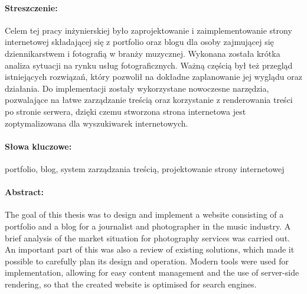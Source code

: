 \documentclass[a4paper, 12pt, twoside]{article}
\numberwithin{figure}{section}
\begin{document}
\begin{sloppypar}






\setcounter{page}{2}
\setcounter{secnumdepth}{3}


\newpage

\paragraph*{Streszczenie:}
Celem tej pracy inżynierskiej było zaprojektowanie i zaimplementowanie strony internetowej składającej się z portfolio oraz blogu dla osoby zajmującej się dziennikarstwem i fotografią w branży muzycznej. Wykonana została krótka analiza sytuacji na rynku usług fotograficznych. Ważną częścią był też przegląd istniejących rozwiązań, który pozwolił na dokładne zaplanowanie jej wyglądu oraz działania. Do implementacji zostały wykorzystane nowoczesne narzędzia, pozwalające na łatwe zarządzanie treścią oraz korzystanie z renderowania treści po stronie serwera, dzięki czemu stworzona strona internetowa jest zoptymalizowana dla wyszukiwarek internetowych. 

\paragraph*{Słowa kluczowe:}
portfolio, blog, system zarządzania treścią, projektowanie strony internetowej

\paragraph*{Abstract:}
The goal of this thesis was to design and implement a website consisting of a portfolio and a blog for a journalist and photographer in the music industry. A brief analysis of the market situation for photography services was carried out. An important part of this was also a review of existing solutions, which made it possible to carefully plan its design and operation. Modern tools were used for implementation, allowing for easy content management and the use of server-side rendering, so that the created website is optimised for search engines.


\end{sloppypar}
\end{document}
